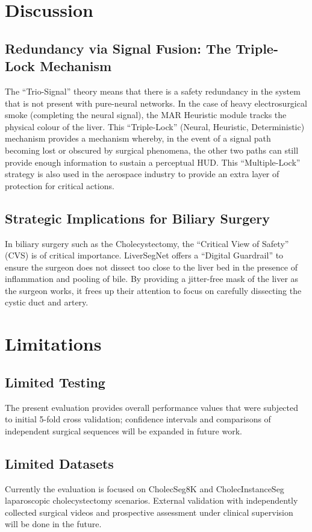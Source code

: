 \documentclass[conference]{IEEEtran}
\begin{document}
\section{Discussion}
\subsection{Redundancy via Signal Fusion: The Triple-Lock Mechanism}
The ``Trio-Signal'' theory means that there is a safety redundancy in the system that is not present with pure-neural networks. In the case of heavy electrosurgical smoke (completing the neural signal), the MAR Heuristic module tracks the physical colour of the liver. This ``Triple-Lock'' (Neural, Heuristic, Deterministic) mechanism provides a mechanism whereby, in the event of a signal path becoming lost or obscured by surgical phenomena, the other two paths can still provide enough information to sustain a perceptual HUD. This ``Multiple-Lock'' strategy is also used in the aerospace industry to provide an extra layer of protection for critical actions.

\subsection{Strategic Implications for Biliary Surgery}
In biliary surgery such as the Cholecystectomy, the ``Critical View of Safety'' (CVS) is of critical importance. LiverSegNet offers a ``Digital Guardrail'' to ensure the surgeon does not dissect too close to the liver bed in the presence of inflammation and pooling of bile. By providing a jitter-free mask of the liver as the surgeon works, it frees up their attention to focus on carefully dissecting the cystic duct and artery.

\section{Limitations}
\subsection{Limited Testing}
The present evaluation provides overall performance values that were subjected to initial 5-fold cross validation; confidence intervals and comparisons of independent surgical sequences will be expanded in future work.

\subsection{Limited Datasets}
Currently the evaluation is focused on CholecSeg8K and CholecInstanceSeg laparoscopic cholecystectomy scenarios. External validation with independently collected surgical videos and prospective assessment under clinical supervision will be done in the future.
\end{document}
